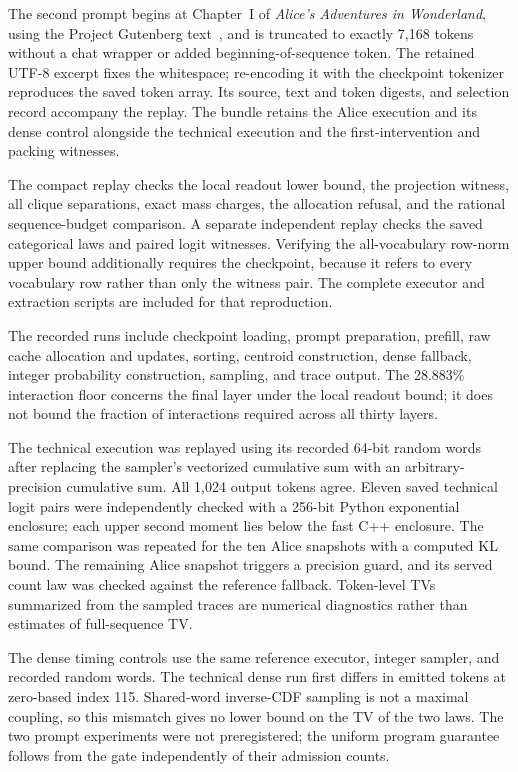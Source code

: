 \documentclass[10pt]{article}
\theoremstyle{definition}\newtheorem{definition}[theorem]{Definition}
\begin{document}
The second prompt begins at Chapter~I of \emph{Alice's Adventures in Wonderland}, using the Project Gutenberg text~\citep{alice}, and is truncated to exactly 7,168 tokens without a chat wrapper or added beginning-of-sequence token. The retained UTF-8 excerpt fixes the whitespace; re-encoding it with the checkpoint tokenizer reproduces the saved token array. Its source, text and token digests, and selection record accompany the replay. The bundle retains the Alice execution and its dense control alongside the technical execution and the first-intervention and packing witnesses.

The compact replay checks the local readout lower bound, the projection witness, all clique separations, exact mass charges, the allocation refusal, and the rational sequence-budget comparison. A separate independent replay checks the saved categorical laws and paired logit witnesses. Verifying the all-vocabulary row-norm upper bound additionally requires the checkpoint, because it refers to every vocabulary row rather than only the witness pair. The complete executor and extraction scripts are included for that reproduction.

The recorded runs include checkpoint loading, prompt preparation, prefill, raw cache allocation and updates, sorting, centroid construction, dense fallback, integer probability construction, sampling, and trace output. The 28.883\% interaction floor concerns the final layer under the local readout bound; it does not bound the fraction of interactions required across all thirty layers.

The technical execution was replayed using its recorded 64-bit random words after replacing the sampler's vectorized cumulative sum with an arbitrary-precision cumulative sum. All 1,024 output tokens agree. Eleven saved technical logit pairs were independently checked with a 256-bit Python exponential enclosure; each upper second moment lies below the fast C++ enclosure. The same comparison was repeated for the ten Alice snapshots with a computed KL bound. The remaining Alice snapshot triggers a precision guard, and its served count law was checked against the reference fallback. Token-level TVs summarized from the sampled traces are numerical diagnostics rather than estimates of full-sequence TV.

The dense timing controls use the same reference executor, integer sampler, and recorded random words. The technical dense run first differs in emitted tokens at zero-based index 115. Shared-word inverse-CDF sampling is not a maximal coupling, so this mismatch gives no lower bound on the TV of the two laws. The two prompt experiments were not preregistered; the uniform program guarantee follows from the gate independently of their admission counts.
\end{document}
